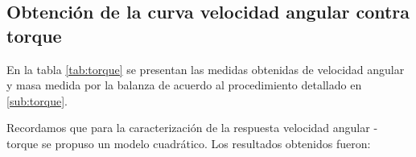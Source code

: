 \documentclass[main]{subfiles}
\begin{document}
\subsection{Obtenci\'on de la curva velocidad angular contra torque}

\begin{figure}
\vspace{-45pt}
\centering
{}

\vspace{-10pt}
  \caption{}
\vspace{-85pt}
\end{figure}

En la tabla \ref{tab:torque} se presentan las medidas obtenidas de velocidad angular y masa medida por la balanza de acuerdo al procedimiento detallado en \ref{sub:torque}.

Recordamos que para la caracterizaci\'on de la respuesta velocidad angular - torque se propuso un modelo cuadr\'atico. Los resultados obtenidos fueron:
\end{document}
